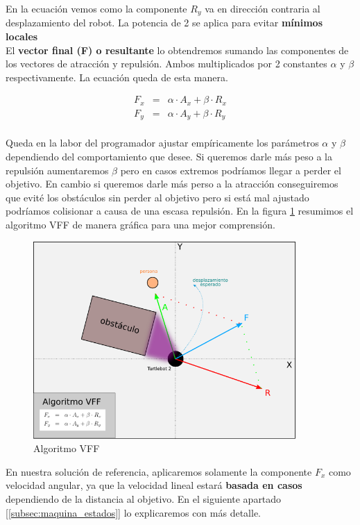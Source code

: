 En la ecuación vemos como la componente $R_y$ va en dirección contraria al desplazamiento del robot. La potencia de 2 se aplica para evitar \textbf{mínimos locales}\\

El \textbf{vector final (F) o resultante} lo obtendremos sumando las componentes de los vectores de atracción y repulsión. Ambos multiplicados por 2 constantes $\alpha$ y $\beta$ respectivamente. La ecuación queda de esta manera.

\begin{eqnarray*}
F_x &=& \alpha \cdot A_x + \beta \cdot R_x\\
F_y &=& \alpha \cdot A_y + \beta \cdot R_y\\
\end{eqnarray*}

Queda en la labor del programador ajustar empíricamente los parámetros $\alpha$ y $\beta$ dependiendo del comportamiento que desee. Si queremos darle más peso a la repulsión aumentaremos $\beta$ pero en casos extremos podríamos llegar a perder el objetivo. En cambio si queremos darle más perso a la atracción conseguiremos que evité los obstáculos sin perder al objetivo pero si está mal ajustado podríamos colisionar a causa de una escasa repulsión. En la figura \ref{fig:esquema_vff} resumimos el algoritmo VFF de manera gráfica para una mejor comprensión.\\

\begin{figure} [H]
  \begin{center}
    \includegraphics[width=10cm]{imagenes/esquema-vff.png}
  \end{center}
  \caption[Algoritmo VFF]{Algoritmo VFF}
  \label{fig:esquema_vff}
\end{figure}

En nuestra solución de referencia, aplicaremos solamente la componente $F_x$ como velocidad angular, ya que la velocidad lineal estará \textbf{basada en casos} dependiendo de la distancia al objetivo. En el siguiente apartado [\ref{subsec:maquina_estados}] lo explicaremos con más detalle.

